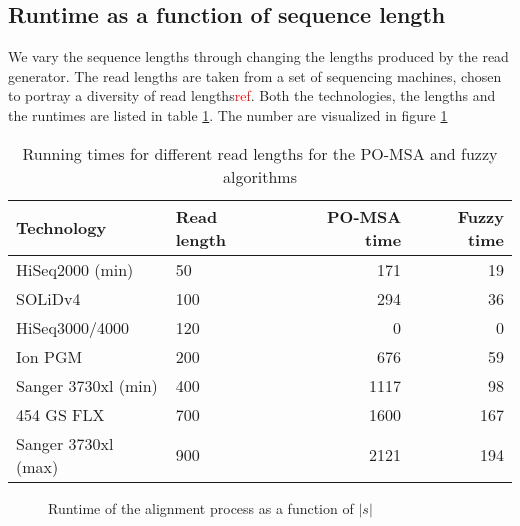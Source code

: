 \documentclass[thesis.tex]{subfiles}
\begin{document}
\subsection*{Runtime as a function of sequence length}
We vary the sequence lengths through changing the lengths produced by the read generator. The read lengths are taken from a set of sequencing machines, chosen to portray a diversity of read lengths\textcolor{red}{ref}. Both the technologies, the lengths and the runtimes are listed in table \ref{tab:runtimes_s}. The number are visualized in figure \ref{fig:runtime_s}
\begin{table}[!h]
  \begin{tabular}{|l|l|r|r|}
    \hline \textbf{Technology} & \textbf{Read length} & \textbf{PO-MSA time} & \textbf{Fuzzy time} \\ \hline
    HiSeq2000 (min) & 50 & 171 & 19 \\ \hline
    SOLiDv4 & 100 & 294 & 36 \\ \hline
    HiSeq3000/4000 & 120 & 0 & 0 \\ \hline
    Ion PGM & 200 & 676 & 59 \\ \hline
    Sanger 3730xl (min) & 400 & 1117 & 98 \\ \hline
    454 GS FLX & 700 & 1600 & 167 \\ \hline
    Sanger 3730xl (max) & 900 & 2121 & 194 \\ \hline
  \end{tabular}
  \caption{Running times for different read lengths for the PO-MSA and fuzzy algorithms}
  \label{tab:runtimes_s}
\end{table}
\begin{figure}[!hb]
  \caption{Runtime of the alignment process as a function of $|s|$}
  \label{fig:runtime_s}
\end{figure}
\clearpage
\end{document}
